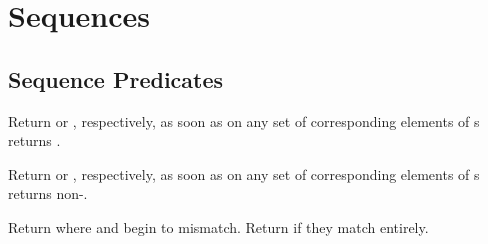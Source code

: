 %
%

\section{Sequences} 
\label{section:Sequences}

\subsection[Seq.~Predicates]{Sequence Predicates} 
\begin{LIST}{1cm}

  {
  Return \retval{\NIL} or \retval{\T}, respectively, as soon as  on
  any set of corresponding elements of s returns \NIL. 
  }

  {
  Return  or \retval{\NIL}, respectively, as soon
  as  on any set of corresponding elements of
  s returns non-\NIL. 
  }

  {
  Return  where
   and  begin to
  mismatch. Return \retval{\NIL} if
  they match entirely.
  }

\end{LIST}


